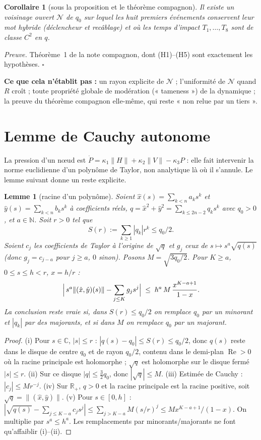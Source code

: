 \documentclass[11pt,a4paper]{article}
\newtheorem{lemme}[theoreme]{Lemme}
\newtheorem{corollaire}[theoreme]{Corollaire}
\theoremstyle{remark}
\newcommand{\norm}[1]{\lVert #1\rVert}
\begin{document}
\begin{corollaire}[sous la proposition et le théorème compagnon]\label{cor:nbhd}
Il existe un voisinage ouvert $\mathcal N$ de $q_0$ sur lequel les huit premiers événements conservent leur mot hybride (déclencheur et recâblage) et où les temps d'impact $T_1,\dots,T_8$ sont de classe $C^2$ en $q$.
\end{corollaire}
\noindent\emph{Preuve.} Théorème~1 de la note compagnon, dont (H1)--(H5) sont exactement les hypothèses. $\square$

\medskip
\noindent\textbf{Ce que cela n'établit pas :} un rayon explicite de $\mathcal N$ ; l'uniformité de $\mathcal N$ quand $R$ croît ; toute propriété globale de modération (« tameness ») de la dynamique ; la preuve du théorème compagnon elle-même, qui reste « non relue par un tiers ».

\section{Lemme de Cauchy autonome}\label{sec:cauchy}
La pression d'un nœud est $\dot P=\kappa_1\norm H+\kappa_2\norm V-\kappa_3P$ : elle fait intervenir la norme euclidienne d'un polynôme de Taylor, non analytique là où il s'annule. Le lemme suivant donne un reste explicite.

\begin{lemme}[racine d'un polynôme]\label{lem:cauchy}
Soient $\hat x(s)=\sum_{k<n}a_ks^k$ et $\hat y(s)=\sum_{k<n}b_ks^k$ à coefficients réels, $q=\hat x^2+\hat y^2=\sum_{k\le2n-2}q_ks^k$ avec $q_0>0$, et $a\in\mathbb N$. Soit $r>0$ tel que
\[ S(r):=\sum_{k\ge1}|q_k|r^k\le q_0/2 .\]
Soient $c_j$ les coefficients de Taylor à l'origine de $\sqrt q$ et $g_j$ ceux de $s\mapsto s^a\sqrt{q(s)}$ (donc $g_j=c_{j-a}$ pour $j\ge a$, $0$ sinon). Posons $M=\sqrt{3q_0/2}$. Pour $K\ge a$, $0\le s\le h<r$, $x=h/r$ :
\[ \Bigl|\,s^a\norm{(\hat x,\hat y)(s)}-\sum_{j\le K}g_js^j\Bigr|\;\le\;h^a\,M\,\frac{x^{K-a+1}}{1-x}. \]
La conclusion reste vraie si, dans $S(r)\le q_0/2$ on remplace $q_0$ par un minorant et $|q_k|$ par des majorants, et si dans $M$ on remplace $q_0$ par un majorant.
\end{lemme}
\begin{proof}
(i) Pour $s\in\mathbb C$, $|s|\le r$ : $|q(s)-q_0|\le S(r)\le q_0/2$, donc $q(s)$ reste dans le disque de centre $q_0$ et de rayon $q_0/2$, contenu dans le demi-plan $\operatorname{Re}>0$ où la racine principale est holomorphe ; $\sqrt q$ est holomorphe sur le disque fermé $|s|\le r$. (ii) Sur ce disque $|q|\le \tfrac32q_0$, donc $|\sqrt q|\le M$. (iii) Estimée de Cauchy : $|c_j|\le M r^{-j}$. (iv) Sur $\mathbb R_+$, $q>0$ et la racine principale est la racine positive, soit $\sqrt q=\norm{(\hat x,\hat y)}$. (v) Pour $s\in[0,h]$ : $|\sqrt{q(s)}-\sum_{j\le K-a}c_js^j|\le\sum_{j>K-a}M(s/r)^j\le Mx^{K-a+1}/(1-x)$. On multiplie par $s^a\le h^a$. Les remplacements par minorants/majorants ne font qu'affaiblir (i)--(ii).
\end{proof}
\end{document}
